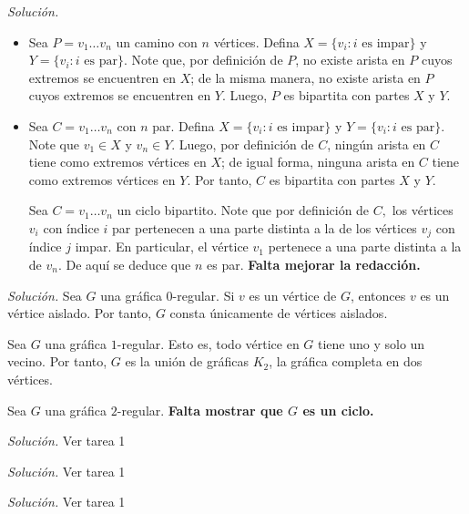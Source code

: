 \documentclass[12pt]{article}
\newenvironment{problem}[2][Problema]{\begin{trivlist}
\item[\hskip \labelsep {\bfseries #1}\hskip \labelsep {\bfseries #2}]}{\end{trivlist}}
\begin{document}
\begin{problem}{1.1.3}
\end{problem}
\textit{Solución.} \begin{itemize}
    \item[a)] Sea $P = v_1 \ldots v_n$ un camino con $n$ vértices. Defina $X = \{v_i: i \text{ es impar} \}$ y $Y = \{v_i: i \text{ es par}\}$. Note que, por definición de $P$, no existe arista en $P$ cuyos extremos se encuentren en $X$; de la misma manera, no existe arista en $P$ cuyos extremos se encuentren en $Y$. Luego, $P$ es bipartita con partes $X$ y $Y$.
    \item[b)] Sea $C = v_1 \ldots v_n$ con $n$ par. Defina $X = \{v_i: i \text{ es impar} \}$ y $Y = \{v_i: i \text{ es par}\}$. Note que $v_1 \in X$ y $v_n \in Y$. Luego, por definición de $C$, ningún arista en $C$ tiene como extremos vértices en $X$; de igual forma, ninguna arista en $C$ tiene como extremos vértices en $Y.$ Por tanto, $C$ es bipartita con partes $X$ y $Y.$
    
    Sea $C = v_1 \ldots v_n$ un ciclo bipartito. Note que por definición de $C,$ los vértices $v_i$ con índice $i$ par pertenecen a una parte distinta a la de los vértices $v_j$ con índice $j$ impar. En particular, el vértice $v_1$ pertenece a una parte distinta a la de $v_n.$ De aquí se deduce que $n$ es par.
    \textbf{Falta mejorar la redacción.}
    \end{itemize}


\begin{problem}{1.1.5}
\end{problem}
\textit{Solución.} Sea $G$ una gráfica $0$-regular.  Si $v$ es un vértice de $G$, entonces $v$ es un vértice aislado. Por tanto, $G$ consta únicamente de vértices aislados.

Sea $G$ una gráfica $1$-regular. Esto es, todo vértice en $G$ tiene uno y solo un vecino. Por tanto, $G$ es la unión de gráficas $K_2$, la gráfica completa en dos vértices.

Sea $G$ una gráfica $2$-regular. \textbf{Falta mostrar que $G$ es un ciclo.} 

\begin{problem}{1.1.7}
\end{problem}
\textit{Solución.} Ver tarea 1


\begin{problem}{1.1.9}
\end{problem}
\textit{Solución.} Ver tarea 1


\begin{problem}{1.1.10}
\end{problem}
\textit{Solución.} Ver tarea 1
\end{document}
